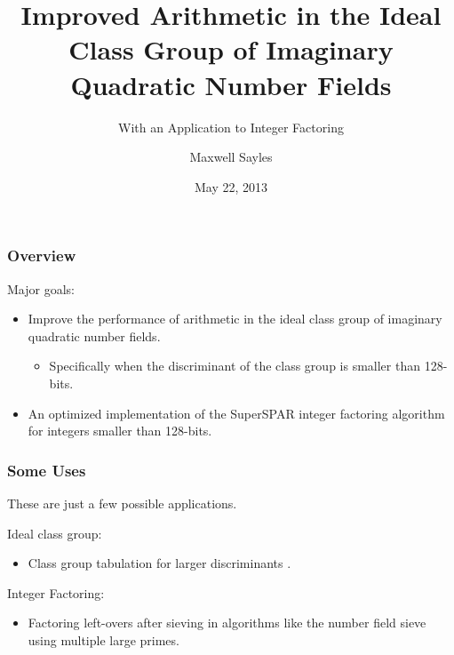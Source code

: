 \documentclass{beamer}
\title[Ideal Class Group]{Improved Arithmetic in the Ideal Class Group of Imaginary Quadratic Number Fields}
\subtitle{With an Application to Integer Factoring}
\author{Maxwell Sayles}
\date{May 22, 2013}
\institute{
	\bigskip 
       Department of Computer Science \\
       University of Calgary
}
\begin{document}
\maketitle

\begin{frame}
\frametitle{Overview}

Major goals:
\begin{itemize}
\item Improve the performance of arithmetic in the ideal class group of imaginary quadratic number fields.
	\begin{itemize}
	\item Specifically when the discriminant of the class group is smaller than 128-bits.
	\end{itemize}
\item An optimized implementation of the SuperSPAR integer factoring algorithm for integers smaller than 128-bits.
\end{itemize}

\end{frame}

\begin{frame}
\frametitle{Some Uses}
These are just a few possible applications. \bigskip

Ideal class group:
\begin{itemize}
\item Class group tabulation for larger discriminants \break [Ramachandran 2006].
\end{itemize}

\bigskip
Integer Factoring:
\begin{itemize}
\item Factoring left-overs after sieving in algorithms like the number field sieve using multiple large primes.
\end{itemize}

\end{frame}
\end{document}
